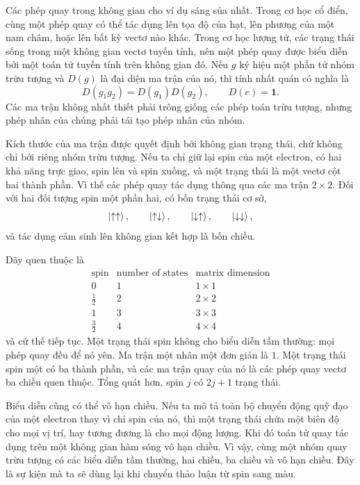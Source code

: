 Các phép quay trong không gian cho ví dụ sáng sủa nhất. Trong cơ học cổ điển, cùng một phép quay có thể tác dụng lên tọa độ của hạt, lên phương của một nam châm, hoặc lên bất kỳ vectơ nào khác. Trong cơ học lượng tử, các trạng thái sống trong một không gian vectơ tuyến tính, nên một phép quay được biểu diễn bởi một toán tử tuyến tính trên không gian đó. Nếu \(g\) ký hiệu một phần tử nhóm trừu tượng và \(D(g)\) là đại diện ma trận của nó, thì tính nhất quán có nghĩa là
\begin{equation}
D(g_1g_2)=D(g_1)D(g_2),
\qquad
D(e)=\boldsymbol 1.
\end{equation}
Các ma trận không nhất thiết phải trông giống các phép toán trừu tượng, nhưng phép nhân của chúng phải tái tạo phép nhân của nhóm.

Kích thước của ma trận được quyết định bởi không gian trạng thái, chứ không chỉ bởi riêng nhóm trừu tượng. Nếu ta chỉ giữ lại spin của một electron, có hai khả năng trực giao, spin lên và spin xuống, và một trạng thái là một vectơ cột hai thành phần. Vì thế các phép quay tác dụng thông qua các ma trận \(2\times2\). Đối với hai đối tượng spin một phần hai, có bốn trạng thái cơ sở,
\begin{equation}
\left\lvert\uparrow\uparrow\right\rangle,\qquad
\left\lvert\uparrow\downarrow\right\rangle,\qquad
\left\lvert\downarrow\uparrow\right\rangle,\qquad
\left\lvert\downarrow\downarrow\right\rangle,
\end{equation}
và tác dụng cảm sinh lên không gian kết hợp là bốn chiều.

Dãy quen thuộc là
\begin{equation}
\begin{array}{c|c|c}
\text{spin} & \text{number of states} & \text{matrix dimension}\\
\hline
0 & 1 & 1\times1\\
\frac12 & 2 & 2\times2\\
1 & 3 & 3\times3\\
\frac32 & 4 & 4\times4
\end{array}
\end{equation}
và cứ thế tiếp tục. Một trạng thái spin không cho biểu diễn tầm thường: mọi phép quay đều để nó yên. Ma trận một nhân một đơn giản là \(1\). Một trạng thái spin một có ba thành phần, và các ma trận quay của nó là các phép quay vectơ ba chiều quen thuộc. Tổng quát hơn, spin \(j\) có \(2j+1\) trạng thái.

Biểu diễn cũng có thể vô hạn chiều. Nếu ta mô tả toàn bộ chuyển động quỹ đạo của một electron thay vì chỉ spin của nó, thì một trạng thái chứa một biên độ cho mọi vị trí, hay tương đương là cho mọi động lượng. Khi đó toán tử quay tác dụng trên một không gian hàm sóng vô hạn chiều. Vì vậy, cùng một nhóm quay trừu tượng có các biểu diễn tầm thường, hai chiều, ba chiều và vô hạn chiều. Đây là sự kiện mà ta sẽ dùng lại khi chuyển thảo luận từ spin sang màu.

